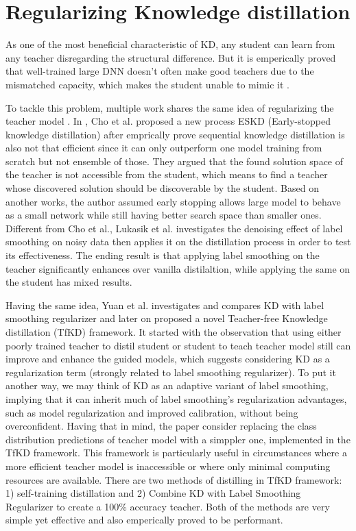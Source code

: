 \section{Regularizing Knowledge distillation}
As one of the most beneficial characteristic of KD, any student can learn from any teacher disregarding the structural difference. But it is emperically proved that well-trained large DNN doesn't often make good teachers due to the mismatched capacity, which makes the student unable to mimic it \cite{complexitygap}. 

To tackle this problem, multiple work shares the same idea of regularizing the teacher model \cite{complexitygap, labelsmoothingnoise}. In \cite{complexitygap}, Cho et al. proposed a new process ESKD (Early-stopped knowledge distillation) after emprically prove sequential knowledge distillation is also not that efficient since it can only outperform one model training from scratch but not ensemble of those. They argued that the found solution space of the teacher is not accessible from the student, which means to find a teacher whose discovered solution should be discoverable by the student. Based on another works, the author assumed early stopping allows large model to behave as a small network while still having better search space than smaller ones. Different from Cho et al., Lukasik et al. \cite{labelsmoothingnoise} investigates the denoising effect of label smoothing on noisy data then applies it on the distillation process in order to test its effectiveness. The ending result is that applying label smoothing on the teacher significantly enhances over vanilla distilaltion, while applying the same on the student has mixed results.

Having the same idea, Yuan et al. \cite{teacherfree} investigates and compares KD with label smoothing regularizer and later on proposed a novel Teacher-free Knowledge distillation (TfKD) framework. It started with the observation that using either poorly trained teacher to distil student or student to teach teacher model still can improve and enhance the guided models, which suggests considering KD as a regularization term (strongly related to label smoothing regularizer). To put it another way, we may think of KD as an adaptive variant of label smoothing, implying that it can inherit much of label smoothing's regularization advantages, such as model regularization and improved calibration, without being overconfident. Having that in mind, the paper consider replacing the class distribution predictions of teacher model with a simppler one, implemented in the TfKD framework. This framework is particularly useful in circumstances where a more efficient teacher model is inaccessible or where only minimal computing resources are available. There are two methods of distilling in TfKD framework: 1) self-training distillation and 2) Combine KD with Label Smoothing Regularizer to create a 100\% accuracy teacher. Both of the methods are very simple yet effective and also emperically proved to be performant.
